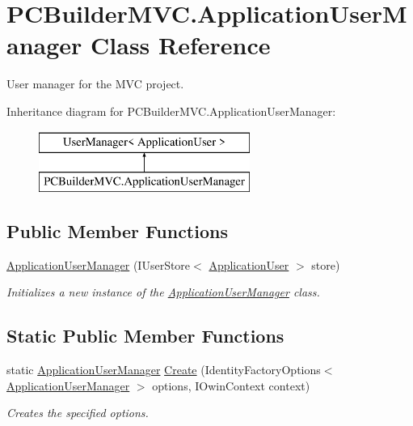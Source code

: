 \hypertarget{class_p_c_builder_m_v_c_1_1_application_user_manager}{}\section{P\+C\+Builder\+M\+V\+C.\+Application\+User\+Manager Class Reference}
\label{class_p_c_builder_m_v_c_1_1_application_user_manager}


User manager for the M\+VC project.  


Inheritance diagram for P\+C\+Builder\+M\+V\+C.\+Application\+User\+Manager\+:\begin{figure}[H]
\begin{center}
\leavevmode
\includegraphics[height=2.000000cm]{class_p_c_builder_m_v_c_1_1_application_user_manager}
\end{center}
\end{figure}
\subsection*{Public Member Functions}
\begin{DoxyCompactItemize}
\item 
\hyperlink{class_p_c_builder_m_v_c_1_1_application_user_manager_af4a41b30be1457d972406354e95fb945}{Application\+User\+Manager} (I\+User\+Store$<$ \hyperlink{class_p_c_builder_m_v_c_1_1_models_1_1_application_user}{Application\+User} $>$ store)
\begin{DoxyCompactList}\small\item\em Initializes a new instance of the \hyperlink{class_p_c_builder_m_v_c_1_1_application_user_manager}{Application\+User\+Manager} class. \end{DoxyCompactList}\end{DoxyCompactItemize}
\subsection*{Static Public Member Functions}
\begin{DoxyCompactItemize}
\item 
static \hyperlink{class_p_c_builder_m_v_c_1_1_application_user_manager}{Application\+User\+Manager} \hyperlink{class_p_c_builder_m_v_c_1_1_application_user_manager_abf2e4bf064febf08f995528ce52545b5}{Create} (Identity\+Factory\+Options$<$ \hyperlink{class_p_c_builder_m_v_c_1_1_application_user_manager}{Application\+User\+Manager} $>$ options, I\+Owin\+Context context)
\begin{DoxyCompactList}\small\item\em Creates the specified options. \end{DoxyCompactList}\end{DoxyCompactItemize}


